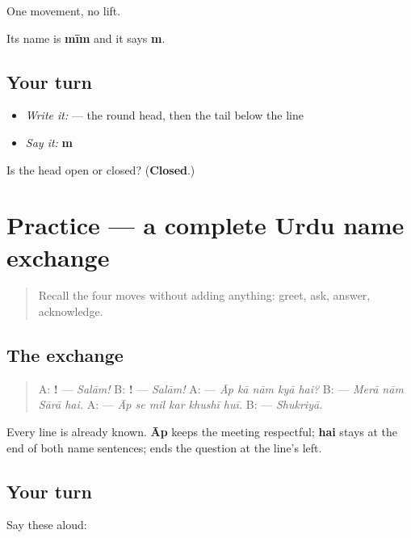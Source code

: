 One movement, no lift.

Its name is \textbf{mīm} and it says \textbf{m}.

\subsection*{Your turn}
\begin{itemize}
\raggedright
  \item \emph{Write it:}  — the round head, then the tail below the line
  \item \emph{Say it:} \textbf{m}
\end{itemize}

\begin{tcolorbox}[breakable,colback=teal!4,colframe=teal!35!black,title={Before you move on}]
Is the head open or closed? (\textbf{Closed}.)
\end{tcolorbox}
\section[Practice]{Practice — a complete Urdu name exchange}

\label{lesson:UR-C03-practice}



\begin{quote}
Recall the four moves without adding anything: greet, ask, answer, acknowledge.
\end{quote}

\subsection*{The exchange}
\begin{quote}
A: \textbf{!} — \emph{Salām!} B: \textbf{!} — \emph{Salām!} A: \textbf{    } — \emph{Āp kā nām kyā hai?} B: \textbf{   } — \emph{Merā nām Sārā hai.} A: \textbf{     } — \emph{Āp se mil kar khushī huī.} B: \textbf{} — \emph{Shukriyā.}
\end{quote}

Every line is already known. \textbf{Āp} keeps the meeting respectful; \textbf{hai} stays at the end of both name sentences; \textbf{} ends the question at the line's left.

\subsection*{Your turn}
Say these aloud:

